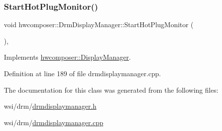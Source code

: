 \subsubsection{\texorpdfstring{Start\+Hot\+Plug\+Monitor()}{StartHotPlugMonitor()}}
{\footnotesize\ttfamily void hwcomposer\+::\+Drm\+Display\+Manager\+::\+Start\+Hot\+Plug\+Monitor (\begin{DoxyParamCaption}{ }\end{DoxyParamCaption})\hspace{0.3cm}{\ttfamily [override]}, {\ttfamily [virtual]}}



Implements \mbox{\hyperlink{classhwcomposer_1_1DisplayManager_a9728735ff10a6e52861c4201bf8c6fb2}{hwcomposer\+::\+Display\+Manager}}.



Definition at line 189 of file drmdisplaymanager.\+cpp.


\begin{DoxyCode}{0}
\end{DoxyCode}


The documentation for this class was generated from the following files\+:\begin{DoxyCompactItemize}
\item 
wsi/drm/\mbox{\hyperlink{drmdisplaymanager_8h}{drmdisplaymanager.\+h}}\item 
wsi/drm/\mbox{\hyperlink{drmdisplaymanager_8cpp}{drmdisplaymanager.\+cpp}}\end{DoxyCompactItemize}
